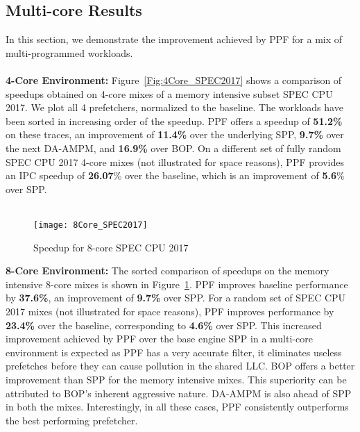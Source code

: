 \subsection{Multi-core Results}
\label{Results-Multi}
In this section, we demonstrate the improvement achieved by PPF for a mix of
multi-programmed workloads.\\ \\
%
\noindent \textbf{4-Core Environment:}
Figure~\ref{Fig:4Core_SPEC2017} shows a comparison of speedups obtained on
4-core mixes of a memory intensive subset SPEC CPU 2017. We plot all 4
prefetchers, normalized to the baseline. The workloads have been sorted in
increasing order of the speedup. PPF offers a speedup of \textbf{51.2\%} on
these traces, an improvement of \textbf{11.4\%} over the underlying SPP,
\textbf{9.7\%} over the next DA-AMPM, and \textbf{16.9\%} over BOP.
On a different set of fully random SPEC CPU 2017 4-core mixes (not illustrated
for space reasons), PPF provides an IPC speedup of \textbf{26.07}\% over the
baseline, which is an improvement of \textbf{5.6}\% over SPP.\\ \\
%
\begin{figure}[ht]
\texttt{[image: 8Core\_SPEC2017]}
\caption{Speedup for 8-core SPEC CPU 2017}
\label{Fig:8Core_SPEC2017}
\end{figure}
%
\noindent \textbf{8-Core Environment:}
The sorted comparison of speedups on the memory intensive 8-core mixes is
shown in Figure~\ref{Fig:8Core_SPEC2017}. PPF improves baseline performance
by \textbf{37.6\%}, an improvement of \textbf{9.7\%} over SPP. For a random
set of SPEC CPU 2017 mixes (not illustrated for space reasons), PPF improves
performance by \textbf{23.4\%} over the baseline, corresponding to
\textbf{4.6\%} over SPP. This increased improvement achieved by PPF over the
base engine SPP in a multi-core environment is expected as PPF has a very
accurate filter, it eliminates useless prefetches before they can cause
pollution in the shared LLC.
BOP offers a better improvement than SPP for the memory intensive mixes. This
superiority can be attributed to BOP's inherent aggressive nature. DA-AMPM is
also ahead of SPP in both the mixes. Interestingly, in all these cases, PPF
consistently outperforms the best performing prefetcher.



